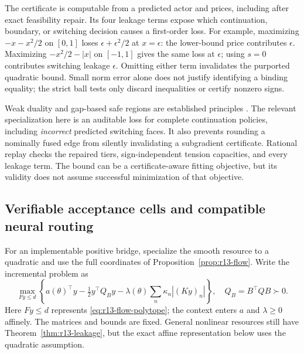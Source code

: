 \documentclass[11pt,letterpaper]{article}
\theoremstyle{definition}
\newcommand{\1}{\mathbf 1}
\begin{document}
The certificate is computable from a predicted actor and prices, including after exact feasibility repair. Its four leakage terms expose which continuation, boundary, or switching decision causes a first-order loss. For example, maximizing $-x-x^2/2$ on $[0,1]$ loses $\epsilon+\epsilon^2/2$ at $x=\epsilon$: the lower-bound price contributes $\epsilon$. Maximizing $-x^2/2-|x|$ on $[-1,1]$ gives the same loss at $\epsilon$; using $s=0$ contributes switching leakage $\epsilon$. Omitting either term invalidates the purported quadratic bound. Small norm error alone does not justify identifying a binding equality; the strict ball tests only discard inequalities or certify nonzero signs.

Weak duality and gap-based safe regions are established principles \citep{BoydVandenberghe2004,Fercoq2015}. The relevant specialization here is an auditable loss for complete continuation policies, including \emph{incorrect} predicted switching faces. It also prevents rounding a nominally fused edge from silently invalidating a subgradient certificate. Rational replay checks the repaired tiers, sign-independent tension capacities, and every leakage term. The bound can be a certificate-aware fitting objective, but its validity does not assume successful minimization of that objective.

\subsection{Verifiable acceptance cells and compatible neural routing}\label{sec:r13-cells}
For an implementable positive bridge, specialize the smooth resource to a quadratic and use the full coordinates of Proposition~\ref{prop:r13-flow}. Write the incremental problem as
\begin{equation}\label{eq:r13-cell-problem}
 \max_{Fy\leq d}\left\{a(\theta)^\top y-\tfrac12y^\top Q_B y
                   -\lambda(\theta)\sum_n\kappa_n|(Ky)_n|\right\},
 \quad Q_B=B^\top QB\succ0.
\end{equation}
Here $Fy\leq d$ represents \eqref{eq:r13-flow-polytope}; the context enters $a$ and $\lambda\geq0$ affinely. The matrices and bounds are fixed. General nonlinear resources still have Theorem~\ref{thm:r13-leakage}, but the exact affine representation below uses the quadratic assumption.
\end{document}
